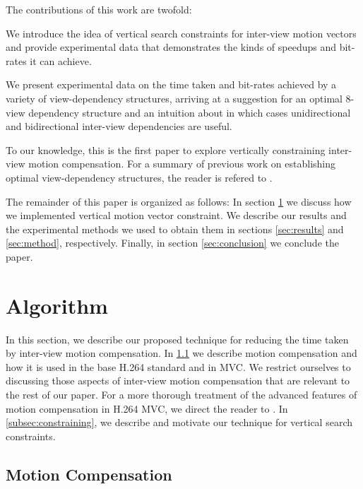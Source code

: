 \documentclass{sig-alternate-05-2015}
\begin{document}
The contributions of this work are twofold: \begin{compactitem}
\item We introduce the idea of vertical search constraints for inter-view
motion vectors and provide experimental data that demonstrates the kinds of
speedups and bit-rates it can achieve.
\item We present experimental data on the time taken and bit-rates achieved by a
variety of view-dependency structures, arriving at a suggestion for an optimal
8-view dependency structure and an intuition about in which cases unidirectional
and bidirectional inter-view dependencies are useful. \end{compactitem} To our
knowledge, this is the first paper to explore vertically constraining inter-view
motion compensation. For a summary of previous work on establishing optimal
view-dependency structures, the reader is refered to \cite{merkle:efficient}.

The remainder of this paper is organized as follows: In section
\ref{sec:algorithm} we discuss how we implemented vertical motion vector
constraint. We describe our results and the experimental methods we used to
obtain them in sections \ref{sec:results} and \ref{sec:method}, respectively.
Finally, in section \ref{sec:conclusion} we conclude the paper.

\section{Algorithm} %
\label{sec:algorithm} %
In this section, we describe our proposed technique for reducing the time taken
by inter-view motion compensation. In \ref{subsec:background} we describe motion
compensation and how it is used in the base H.264 standard and in MVC.
We restrict ourselves to discussing those aspects of inter-view motion
compensation that are relevant to the rest of our paper. For a more thorough
treatment of the advanced features of motion compensation in H.264 MVC, we
direct the reader to \cite{vetro:overview}. In \ref{subsec:constraining}, we
describe and motivate our technique for vertical search constraints.

\subsection{Motion Compensation}
\label{subsec:background}
\end{document}
